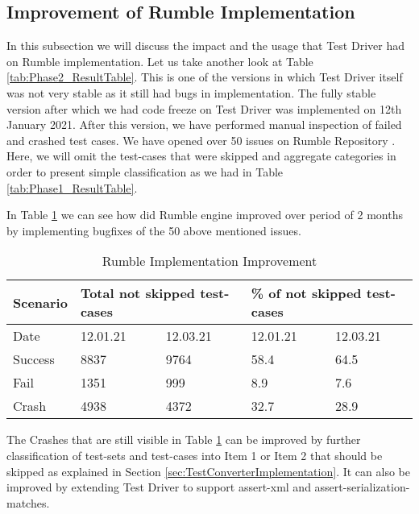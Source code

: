 \subsection{Improvement of Rumble Implementation}
In this subsection we will discuss the impact and the usage that Test Driver had on Rumble implementation. Let us take another look at Table \ref{tab:Phase2_ResultTable}. This is one of the versions in which Test Driver itself was not very stable as it still had bugs in implementation. The fully stable version after which we had code freeze on Test Driver was implemented on 12th January 2021. After this version, we have performed manual inspection of failed and crashed test cases. We have opened over 50 issues on Rumble Repository \cite{RumbleRepository}. Here, we will omit the test-cases that were skipped and aggregate categories in order to present simple classification as we had in Table \ref{tab:Phase1_ResultTable}.

In Table \ref{tab:bugsimprovement} we can see how did Rumble engine improved over period of 2 months by implementing bugfixes of the 50 above mentioned issues.
 
\begin{table}[h!]
	\centering
	\begin{tabular}{|l|l|l|l|l|}
		\hline
		Scenario & \multicolumn{2}{l|}{Total not skipped test-cases} & \multicolumn{2}{l|}{\% of not skipped test-cases} \\ \hline
		Date     & 12.01.21                & 12.03.21                & 12.01.21                & 12.03.21                \\ \hline
		Success  & 8837                    & 9764                    & 58.4                    & 64.5                    \\ \hline
		Fail     & 1351                    & 999                     & 8.9                     & 7.6                     \\ \hline
		Crash    & 4938                    & 4372                    & 32.7                    & 28.9                    \\ \hline
	\end{tabular}
	\caption{Rumble Implementation Improvement}
	\label{tab:bugsimprovement}
\end{table}

The Crashes that are still visible in Table \ref{tab:bugsimprovement} can be improved by further classification of test-sets and test-cases into Item 1 or Item 2 that should be skipped as explained in Section \ref{sec:TestConverterImplementation}. It can also be improved by extending Test Driver to support assert-xml and assert-serialization-matches.

